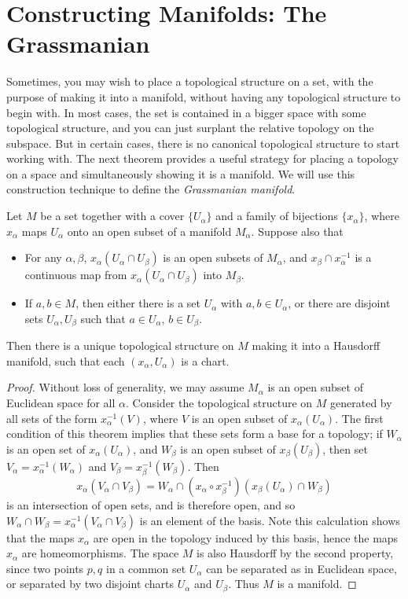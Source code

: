 \section{Constructing Manifolds: The Grassmanian}

Sometimes, you may wish to place a topological structure on a set, with the purpose of making it into a manifold, without having any topological structure to begin with. In most cases, the set is contained in a bigger space with some topological structure, and you can just surplant the relative topology on the subspace. But in certain cases, there is no canonical topological structure to start working with. The next theorem provides a useful strategy for placing a topology on a space and simultaneously showing it is a manifold. We will use this construction technique to define the \emph{Grassmanian manifold}.

\begin{theorem}
    Let $M$ be a set together with a cover $\{ U_\alpha \}$ and a family of bijections $\{ x_\alpha \}$, where $x_\alpha$ maps $U_\alpha$ onto an open subset of a manifold $M_\alpha$. Suppose also that
    \begin{itemize}
        \item For any $\alpha, \beta$, $x_\alpha(U_\alpha \cap U_\beta)$ is an open subsets of $M_\alpha$, and $x_\beta \cap x_\alpha^{-1}$ is a continuous map from $x_\alpha(U_\alpha \cap U_\beta)$ into $M_\beta$.
        \item If $a, b \in M$, then either there is a set $U_\alpha$ with $a,b \in U_\alpha$, or there are disjoint sets $U_\alpha, U_\beta$ such that $a \in U_\alpha$, $b \in U_\beta$.
    \end{itemize}
    Then there is a unique topological structure on $M$ making it into a Hausdorff manifold, such that each $(x_\alpha, U_\alpha)$ is a chart.
\end{theorem}
\begin{proof}
    Without loss of generality, we may assume $M_\alpha$ is an open subset of Euclidean space for all $\alpha$. Consider the topological structure on $M$ generated by all sets of the form $x_\alpha^{-1}(V)$, where $V$ is an open subset of $x_\alpha(U_\alpha)$. The first condition of this theorem implies that these sets form a base for a topology; if $W_\alpha$ is an open set of $x_\alpha(U_\alpha)$, and $W_\beta$ is an open subset of $x_\beta(U_\beta)$, then set $V_\alpha = x_\alpha^{-1}(W_\alpha)$ and $V_\beta = x_\beta^{-1}(W_\beta)$. Then
    \[ x_\alpha(V_\alpha \cap V_\beta) = W_\alpha \cap (x_\alpha \circ x_\beta^{-1})(x_\beta(U_\alpha) \cap W_\beta) \]
    is an intersection of open sets, and is therefore open, and so $W_\alpha \cap W_\beta = x_\alpha^{-1}(V_\alpha \cap V_\beta)$ is an element of the basis. Note this calculation shows that the maps $x_\alpha$ are open in the topology induced by this basis, hence the maps $x_\alpha$ are homeomorphisms. The space $M$ is also Hausdorff by the second property, since two points $p,q$ in a common set $U_\alpha$ can be separated as in Euclidean space, or separated by two disjoint charts $U_\alpha$ and $U_\beta$. Thus $M$ is a manifold.
\end{proof}

